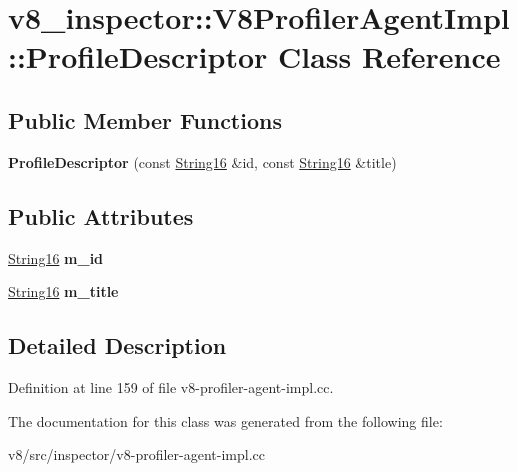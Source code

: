 \hypertarget{classv8__inspector_1_1V8ProfilerAgentImpl_1_1ProfileDescriptor}{}\section{v8\+\_\+inspector\+:\+:V8\+Profiler\+Agent\+Impl\+:\+:Profile\+Descriptor Class Reference}
\label{classv8__inspector_1_1V8ProfilerAgentImpl_1_1ProfileDescriptor}
\subsection*{Public Member Functions}
\begin{DoxyCompactItemize}
\item 
\mbox{\label{classv8__inspector_1_1V8ProfilerAgentImpl_1_1ProfileDescriptor_ab005c272b9b13c67117d03854e6922a8}} 
{\bfseries Profile\+Descriptor} (const \mbox{\hyperlink{classv8__inspector_1_1String16}{String16}} \&id, const \mbox{\hyperlink{classv8__inspector_1_1String16}{String16}} \&title)
\end{DoxyCompactItemize}
\subsection*{Public Attributes}
\begin{DoxyCompactItemize}
\item 
\mbox{\label{classv8__inspector_1_1V8ProfilerAgentImpl_1_1ProfileDescriptor_a425ed914e230704a108ff2d56f09c1df}} 
\mbox{\hyperlink{classv8__inspector_1_1String16}{String16}} {\bfseries m\+\_\+id}
\item 
\mbox{\label{classv8__inspector_1_1V8ProfilerAgentImpl_1_1ProfileDescriptor_a99902d69d78c2a3c0bac53fc6dfdc49f}} 
\mbox{\hyperlink{classv8__inspector_1_1String16}{String16}} {\bfseries m\+\_\+title}
\end{DoxyCompactItemize}


\subsection{Detailed Description}


Definition at line 159 of file v8-\/profiler-\/agent-\/impl.\+cc.



The documentation for this class was generated from the following file\+:\begin{DoxyCompactItemize}
\item 
v8/src/inspector/v8-\/profiler-\/agent-\/impl.\+cc\end{DoxyCompactItemize}
